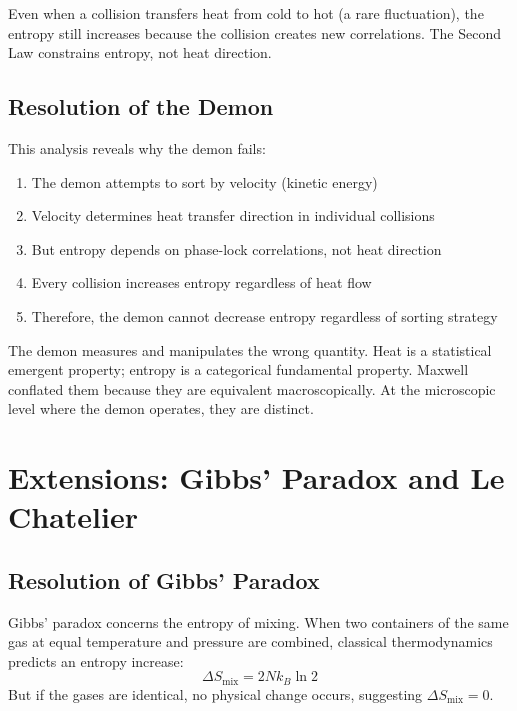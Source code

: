 \documentclass[twocolumn,showpacs,preprintnumbers,amsmath,amssymb,prd]{revtex4-2}
\theoremstyle{definition}
\theoremstyle{remark}
\begin{document}
Even when a collision transfers heat from cold to hot (a rare fluctuation), the entropy still increases because the collision creates new correlations. The Second Law constrains entropy, not heat direction.

\subsection{Resolution of the Demon}

This analysis reveals why the demon fails:

\begin{enumerate}
\item The demon attempts to sort by velocity (kinetic energy)
\item Velocity determines heat transfer direction in individual collisions
\item But entropy depends on phase-lock correlations, not heat direction
\item Every collision increases entropy regardless of heat flow
\item Therefore, the demon cannot decrease entropy regardless of sorting strategy
\end{enumerate}

The demon measures and manipulates the wrong quantity. Heat is a statistical emergent property; entropy is a categorical fundamental property. Maxwell conflated them because they are equivalent macroscopically. At the microscopic level where the demon operates, they are distinct.

\section{Extensions: Gibbs' Paradox and Le Chatelier}
\label{sec:extensions}

\subsection{Resolution of Gibbs' Paradox}

Gibbs' paradox concerns the entropy of mixing. When two containers of the same gas at equal temperature and pressure are combined, classical thermodynamics predicts an entropy increase:
\begin{equation}
\Delta S_{\text{mix}} = 2Nk_B \ln 2
\end{equation}
But if the gases are identical, no physical change occurs, suggesting $\Delta S_{\text{mix}} = 0$.
\end{document}
